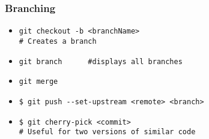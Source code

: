 \documentclass{beamer}
\begin{document}
\begin{frame}[fragile]
\frametitle{Branching}
\begin{itemize}
\item<1,2> \verb=git checkout -b <branchName>=\\
\verb=# Creates a branch=
\item<1,2> \verb=git branch      #displays all branches=
\item<1,2> \verb=git merge=
\item<2> \verb=$ git push --set-upstream <remote> <branch>=\pause
\item<3> \verb=$ git cherry-pick <commit>=\\
\verb=# Useful for two versions of similar code=
\end{itemize}

\end{frame}


\end{document}
